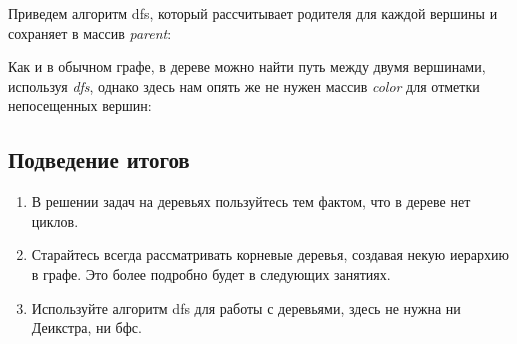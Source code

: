 \documentclass[../../main.tex]{subfiles}
\begin{document}
Приведем алгоритм dfs, который рассчитывает родителя для каждой вершины и сохраняет в массив \textit{parent}:




Как и в обычном графе, в дереве можно найти путь между двумя вершинами, используя \textit{dfs}, однако здесь нам опять же не нужен массив \textit{color} для 
отметки непосещенных вершин:




\subsection{Подведение итогов}

\begin{enumerate}[label=\Roman*]
    \item В решении задач на деревьях пользуйтесь тем фактом, что в дереве нет циклов.
    \item Старайтесь всегда рассматривать корневые деревья, создавая некую иерархию в графе. Это более подробно будет в следующих занятиях. 
    \item Используйте алгоритм dfs для работы с деревьями, здесь не нужна ни Деикстра, ни бфс.
\end{enumerate}
\end{document}
